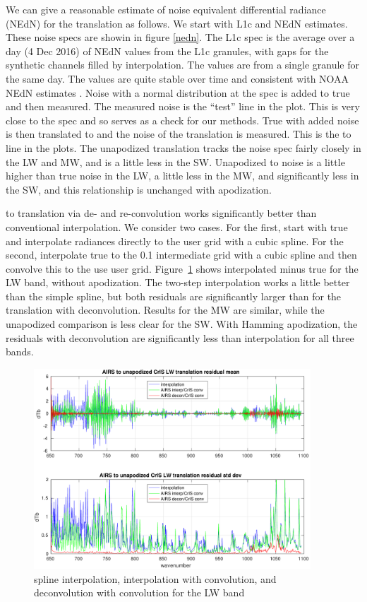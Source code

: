 \documentclass[11pt]{article}
\begin{document}
We can give a reasonable estimate of noise equivalent differential
radiance (NEdN) for the translation as follows.  We start with
{\airs} L1c and {\cris} NEdN estimates.  These noise specs are
showin in figure \ref{nedn}.  The L1c spec is the average over a day
(4 Dec 2016) of NEdN values from the L1c granules, with gaps for the
synthetic channels filled by interpolation.  The {\cris} values are
from a single {\ccast} \cite{git:ccast} granule for the same day.
The {\ccast} values are quite stable over time and consistent with
NOAA {\cris} NEdN estimates \cite{zav2013}.  Noise with a normal
distribution at the {\airs} spec is added to true {\airs} and then
measured.  The measured {\airs} noise is the ``test'' line in the
plot.  This is very close to the spec and so serves as a check for
our methods.  True {\airs} with added noise is then translated to
{\cris} and the noise of the translation is measured.  This is the
{\airs} to {\cris} line in the plots.  The unapodized translation
tracks the {\airs} noise spec fairly closely in the LW and MW, and
is a little less in the SW.  Unapodized {\airs} to {\cris} noise is
a little higher than true {\cris} noise in the LW, a little less in
the MW, and significantly less in the SW, and this relationship is
unchanged with apodization.

{\airs} to {\cris} translation via de- and re-convolution works
significantly better than conventional interpolation.  We consider
two cases.  For the first, start with true {\airs} and interpolate
radiances directly to the {\cris} user grid with a cubic spline.
For the second, interpolate true {\airs} to the 0.1 {\wn}
intermediate grid with a cubic spline and then convolve this to the
use {\cris} user grid.  Figure~\ref{intpLW} shows interpolated
{\cris} minus true {\cris} for the LW band, without apodization.
The two-step interpolation works a little better than the simple
spline, but both residuals are significantly larger than for the
translation with deconvolution.  Results for the MW are similar,
while the unapodized comparison is less clear for the SW.  With
Hamming apodization, the residuals with deconvolution are
significantly less than interpolation for all three bands.

\begin{figure} %
  \centering
  \includegraphics[height=7.5cm]{figures/a2cris_interp_LW.pdf}
  \caption{spline interpolation, interpolation with convolution, 
    and deconvolution with convolution for the {\cris} LW band}
  \label{intpLW}
\end{figure}
\end{document}
